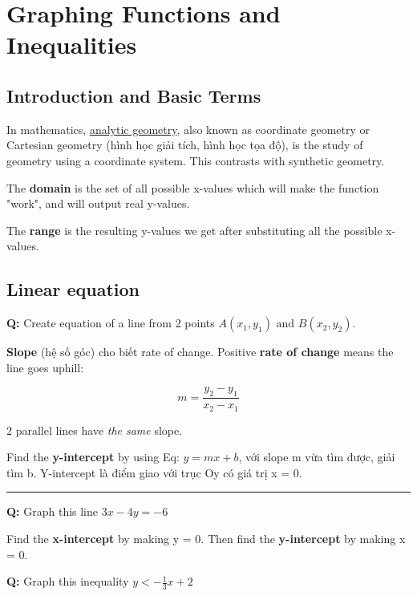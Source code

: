\chapter{Graphing Functions and Inequalities}

\section{Introduction and Basic Terms}

In mathematics, \href{https://en.wikipedia.org/wiki/Analytic_geometry}{analytic geometry}, also known as coordinate geometry or Cartesian geometry (hình học giải tích, hình học tọa độ), is the study of geometry using a coordinate system. This contrasts with synthetic geometry. 

The \textbf{domain} is the set of all possible x-values which will make the function "work", and will output real y-values.

The \textbf{range} is the resulting y-values we get after substituting all the possible x-values.

\section{Linear equation}

\textbf{Q:} Create equation of a line from 2 points \(A(x_{1},y_{1})\text{ and } B(x_{2},y_{2})\).

\textbf{Slope} (hệ số góc) cho biết rate of change. Positive \textbf{rate of change} means the line goes uphill:

\begin{equation}
  m = \frac{y_{2}-y_{1}}{x_{2}-x_{1}}
  \label{eq:3.1}
\end{equation}

2 parallel lines have \textit{the same} slope.

Find the \textbf{y-intercept} by using Eq: \(y = mx + b\), với slope m vừa tìm được, giải tìm b. Y-intercept là điểm giao với trục Oy có giá trị x = 0.

\par\rule{\textwidth}{0.5pt}

\textbf{Q:} Graph this line \(3x-4y=-6\)

Find the \textbf{x-intercept} by making y = 0. Then find the \textbf{y-intercept} by making x = 0.

\vspace{5mm}

\textbf{Q:} Graph this inequality \(y < -\frac{1}{3}x+2\)

